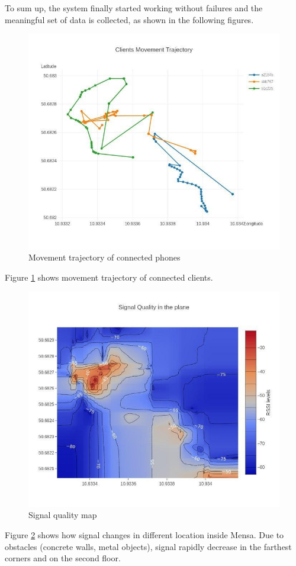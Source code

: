 To sum up, the system finally started working without failures and the meaningful set of data is collected, as shown in the following figures.



\begin{figure}[H]
	\centering
	\includegraphics[width=0.7\linewidth,keepaspectratio]{images/experiment_3_1.jpg}
	\caption{Movement trajectory of connected phones}
	\label{fig:movement-trajectory}
\end{figure}

Figure \ref{fig:movement-trajectory} shows movement trajectory of connected clients. 

\begin{figure}[H]
	\centering
	\includegraphics[width=0.7\linewidth,keepaspectratio]{images/experiment_3_2.jpg}
	\caption{Signal quality map}
	\label{fig:signal-quality-heatmap}
\end{figure}

Figure \ref{fig:signal-quality-heatmap} shows how signal changes in different location inside Mensa. Due to obstacles (concrete walls, metal objects), signal rapidly decrease in the farthest corners and on the second floor.

